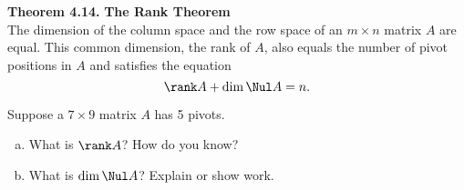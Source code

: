 \newpage


\begin{boxthm}
	\textbf{Theorem 4.14.}
	\textbf{The Rank Theorem} \\
	The dimension of the column space and the row space of an $m\times n$ matrix $A$ are equal. This common dimension, the rank of $A$, also equals the number of pivot positions in $A$ and satisfies the equation
	\vspace{-1em}
	$$ \rank A + \dim\Nul A = n. $$
\end{boxthm}

\begin{exercise} %
	Suppose a $7\times 9$ matrix $A$ has 5 pivots.
	\begin{multicols}{2}
		\begin{enumerate}[(a)]
			\item What is $\rank A$? How do you know?
			\item What is $\dim\Nul A$? Explain or show work.
		\end{enumerate}
	\end{multicols}
\end{exercise}
\vspace{1.5in}


